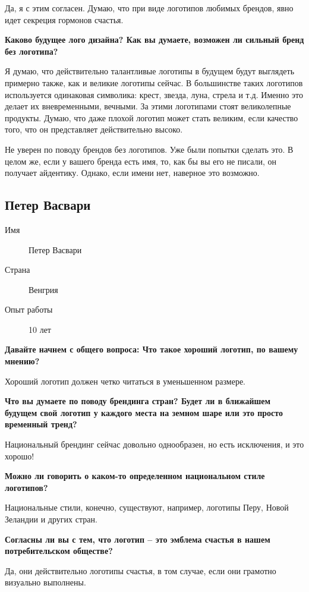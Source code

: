 Да, я с этим согласен. Думаю, что при виде логотипов любимых брендов, явно идет секреция гормонов счастья.


\textbf{Каково будущее лого дизайна? Как вы думаете, возможен ли сильный бренд без логотипа?}

Я думаю, что действительно талантливые логотипы в будущем будут выглядеть примерно также, как и великие логотипы сейчас. В большинстве таких логотипов используется одинаковая символика: крест, звезда, луна, стрела и т.д. Именно это делает их вневременными, вечными. За этими логотипами стоят великолепные продукты. Думаю, что даже плохой логотип может стать великим, если качество того, что он представляет действительно высоко.

Не уверен по поводу брендов без логотипов. Уже были попытки сделать это. 
В целом же, если у вашего бренда есть имя, то, как бы вы его не писали, он получает айдентику. Однако, если имени нет, наверное это возможно.


\clearpage
\subsection{Петер Васвари}

\begin{description}
\item[Имя] Петер Васвари
\item[Страна] Венгрия
\item[Опыт работы] 10 лет
\end{description}

\textbf{Давайте начнем с общего вопроса: Что такое хороший логотип, по вашему мнению?}

Хороший логотип должен четко читаться в уменьшенном размере.


\textbf{Что вы думаете по поводу брендинга стран? Будет ли в ближайшем будущем свой логотип у каждого места на земном шаре или это просто временный тренд?}

Национальный брендинг сейчас довольно однообразен, но есть исключения, и это хорошо! 


\textbf{Можно ли говорить о каком-то определенном национальном стиле логотипов?}

Национальные стили, конечно, существуют, например, логотипы Перу, Новой Зеландии и других стран.

\textbf{Согласны ли вы с тем, что логотип – это эмблема счастья в нашем потребительском обществе?}

Да, они действительно логотипы счастья, в том случае, если они грамотно визуально выполнены.


